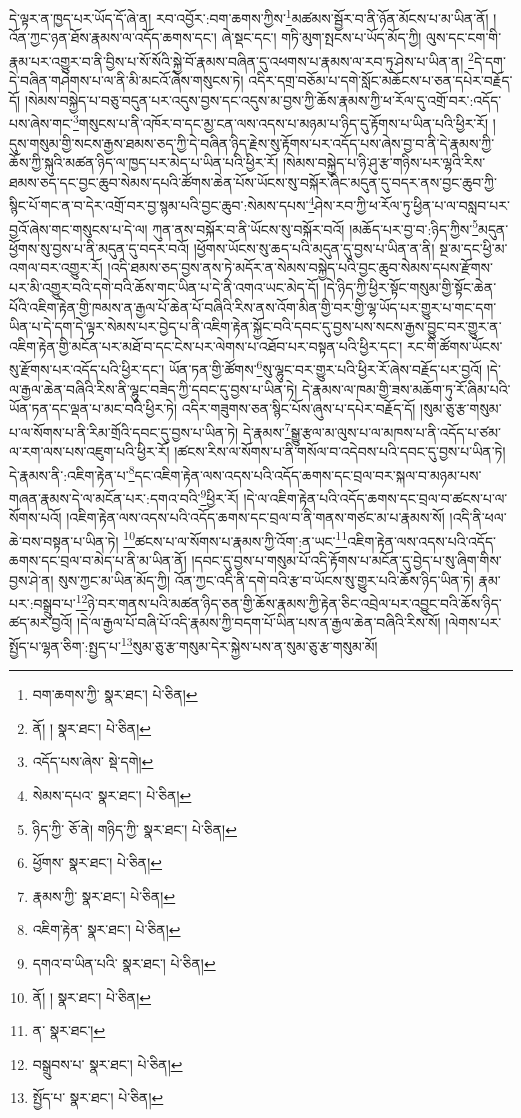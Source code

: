 དེ་ལྟར་ན་ཁྱད་པར་ཡོད་དོ་ཞེ་ན། རབ་འབྱོར་:བག་ཆགས་ཀྱིས་\footnote{བག་ཆགས་ཀྱི་  སྣར་ཐང་།  པེ་ཅིན། }མཚམས་སྦྱོར་བ་ནི་ཉོན་མོངས་པ་མ་ཡིན་ནོ། །འོན་ཀྱང་ཉན་ཐོས་རྣམས་ལ་འདོད་ཆགས་དང་། ཞེ་སྡང་དང་། གཏི་མུག་སྤངས་པ་ཡོད་མོད་ཀྱི། ལུས་དང་ངག་གི་རྣམ་པར་འགྱུར་བ་ནི་བྱིས་པ་སོ་སོའི་སྐྱེ་བོ་རྣམས་བཞིན་དུ་འཕགས་པ་རྣམས་ལ་རབ་ཏུ་ཤེས་པ་ཡིན་ན། \footnote{ནོ། །   སྣར་ཐང་།  པེ་ཅིན། }དེ་དག་དེ་བཞིན་གཤེགས་པ་ལ་ནི་མི་མངའོ་ཞེས་གསུངས་ཏེ། འདིར་དགྲ་བཅོམ་པ་དགེ་སློང་མཆོངས་པ་ཅན་དཔེར་བརྗོད་དོ། །སེམས་བསྐྱེད་པ་བཅུ་བདུན་པར་འདུས་བྱས་དང་འདུས་མ་བྱས་ཀྱི་ཆོས་རྣམས་ཀྱི་ཕ་རོལ་དུ་འགྲོ་བར་:འདོད་པས་ཞེས་གང་\footnote{འདོད་པས་ཞེས་  སྡེ་དགེ། }གསུངས་པ་ནི་འཁོར་བ་དང་མྱ་ངན་ལས་འདས་པ་མཉམ་པ་ཉིད་དུ་རྟོགས་པ་ཡིན་པའི་ཕྱིར་རོ། །དུས་གསུམ་གྱི་སངས་རྒྱས་ཐམས་ཅད་ཀྱི་དེ་བཞིན་ཉིད་རྗེས་སུ་རྟོགས་པར་འདོད་པས་ཞེས་བྱ་བ་ནི་དེ་རྣམས་ཀྱི་ཆོས་ཀྱི་སྐུའི་མཚན་ཉིད་ལ་ཁྱད་པར་མེད་པ་ཡིན་པའི་ཕྱིར་རོ། །སེམས་བསྐྱེད་པ་ཉི་ཤུ་རྩ་གཉིས་པར་ལྷའི་རིས་ཐམས་ཅད་དང་བྱང་ཆུབ་སེམས་དཔའི་ཚོགས་ཆེན་པོས་ཡོངས་སུ་བསྐོར་ཞིང་མདུན་དུ་བདར་ནས་བྱང་ཆུབ་ཀྱི་སྙིང་པོ་གང་ན་བ་དེར་འགྲོ་བར་བྱ་སྙམ་པའི་བྱང་ཆུབ་:སེམས་དཔས་\footnote{སེམས་དཔའ་  སྣར་ཐང་།  པེ་ཅིན། }ཤེས་རབ་ཀྱི་ཕ་རོལ་ཏུ་ཕྱིན་པ་ལ་བསླབ་པར་བྱའོ་ཞེས་གང་གསུངས་པ་དེ་ལ། ཀུན་ནས་བསྐོར་བ་ནི་ཡོངས་སུ་བསྐོར་བའོ། །མཆོད་པར་བྱ་བ་:ཉིད་ཀྱིས་\footnote{ཉིད་ཀྱི་  ཅོ་ནེ། གཉིད་ཀྱི་  སྣར་ཐང་།  པེ་ཅིན། }མདུན་ཕྱོགས་སུ་བྱས་པ་ནི་མདུན་དུ་བདར་བའོ། །ཕྱོགས་ཡོངས་སུ་ཆད་པའི་མདུན་དུ་བྱས་པ་ཡིན་ན་ནི། སྔ་མ་དང་ཕྱི་མ་འགལ་བར་འགྱུར་རོ། །འདི་ཐམས་ཅད་བྱས་ནས་ཏེ་མདོར་ན་སེམས་བསྐྱེད་པའི་བྱང་ཆུབ་སེམས་དཔས་རྫོགས་པར་མི་འགྱུར་བའི་དགེ་བའི་ཆོས་གང་ཡིན་པ་དེ་ནི་འགའ་ཡང་མེད་དོ། །དེ་ཉིད་ཀྱི་ཕྱིར་སྟོང་གསུམ་གྱི་སྟོང་ཆེན་པོའི་འཇིག་རྟེན་གྱི་ཁམས་ན་རྒྱལ་པོ་ཆེན་པོ་བཞིའི་རིས་ནས་འོག་མིན་གྱི་བར་གྱི་ལྷ་ཡོད་པར་གྱུར་པ་གང་དག་ཡིན་པ་དེ་དག་དེ་ལྟར་སེམས་པར་བྱེད་པ་ནི་འཇིག་རྟེན་སྐྱོང་བའི་དབང་དུ་བྱས་པས་སངས་རྒྱས་བྱུང་བར་གྱུར་ན་འཇིག་རྟེན་གྱི་མངོན་པར་མཐོ་བ་དང་ངེས་པར་ལེགས་པ་འཐོབ་པར་བསྟན་པའི་ཕྱིར་དང་། རང་གི་ཚོགས་ཡོངས་སུ་རྫོགས་པར་འདོད་པའི་ཕྱིར་དང་། ཡོན་ཏན་གྱི་ཚོགས་\footnote{ཕྱོགས་  སྣར་ཐང་།  པེ་ཅིན། }སུ་ལྷུང་བར་གྱུར་པའི་ཕྱིར་རོ་ཞེས་བརྗོད་པར་བྱའོ། །དེ་ལ་རྒྱལ་ཆེན་བཞིའི་རིས་ནི་ལྷུང་བཟེད་ཀྱི་དབང་དུ་བྱས་པ་ཡིན་ཏེ། དེ་རྣམས་ལ་ཁམ་གྱི་ཟས་མཆོག་ཏུ་རོ་ཞིམ་པའི་ཡོན་ཏན་དང་ལྡན་པ་མང་བའི་ཕྱིར་ཏེ། འདིར་གཟུགས་ཅན་སྙིང་པོས་ཞུས་པ་དཔེར་བརྗོད་དོ། །སུམ་ཅུ་རྩ་གསུམ་པ་ལ་སོགས་པ་ནི་རིམ་གྲོའི་དབང་དུ་བྱས་པ་ཡིན་ཏེ། དེ་རྣམས་\footnote{རྣམས་ཀྱི་  སྣར་ཐང་།  པེ་ཅིན། }སྒྱུ་རྩལ་མ་ལུས་པ་ལ་མཁས་པ་ནི་འདོད་པ་ཙམ་ལ་རག་ལས་པས་འཇུག་པའི་ཕྱིར་རོ། །ཚངས་རིས་ལ་སོགས་པ་ནི་གསོལ་བ་འདེབས་པའི་དབང་དུ་བྱས་པ་ཡིན་ཏེ། དེ་རྣམས་ནི་:འཇིག་རྟེན་པ་\footnote{འཇིག་རྟེན་  སྣར་ཐང་།  པེ་ཅིན། }དང་འཇིག་རྟེན་ལས་འདས་པའི་འདོད་ཆགས་དང་བྲལ་བར་སྐལ་བ་མཉམ་པས་གཞན་རྣམས་དེ་ལ་མངོན་པར་:དགའ་བའི་\footnote{དགའ་བ་ཡིན་པའི་  སྣར་ཐང་།  པེ་ཅིན། }ཕྱིར་རོ། །དེ་ལ་འཇིག་རྟེན་པའི་འདོད་ཆགས་དང་བྲལ་བ་ཚངས་པ་ལ་སོགས་པའོ། །འཇིག་རྟེན་ལས་འདས་པའི་འདོད་ཆགས་དང་བྲལ་བ་ནི་གནས་གཙང་མ་པ་རྣམས་སོ། །འདི་ནི་ཕལ་ཆེ་བས་བསྟན་པ་ཡིན་ཏེ། \footnote{ནོ། །   སྣར་ཐང་།  པེ་ཅིན། }ཚངས་པ་ལ་སོགས་པ་རྣམས་ཀྱི་འོག་:ན་ཡང་\footnote{ན་  སྣར་ཐང་། }འཇིག་རྟེན་ལས་འདས་པའི་འདོད་ཆགས་དང་བྲལ་བ་མེད་པ་ནི་མ་ཡིན་ནོ། །དབང་དུ་བྱས་པ་གསུམ་པོ་འདི་རྟོགས་པ་མངོན་དུ་བྱེད་པ་སུ་ཞིག་གིས་བྱས་ཤེ་ན། སུས་ཀྱང་མ་ཡིན་མོད་ཀྱི། འོན་ཀྱང་འདི་ནི་དགེ་བའི་རྩ་བ་ཡོངས་སུ་གྱུར་པའི་ཆོས་ཉིད་ཡིན་ཏེ། རྣམ་པར་:བསྒྲུབ་པ་\footnote{བསྒྲུབས་པ་  སྣར་ཐང་།  པེ་ཅིན། }ཉེ་བར་གནས་པའི་མཚན་ཉིད་ཅན་གྱི་ཆོས་རྣམས་ཀྱི་རྟེན་ཅིང་འབྲེལ་པར་འབྱུང་བའི་ཆོས་ཉིད་ཚད་མར་བྱའོ། །དེ་ལ་རྒྱལ་པོ་བཞི་པོ་འདི་རྣམས་ཀྱི་བདག་པོ་ཡིན་པས་ན་རྒྱལ་ཆེན་བཞིའི་རིས་སོ། །ལེགས་པར་སྤྱོད་པ་ལྷན་ཅིག་:སྤྱད་པ་\footnote{སྤྱོད་པ་  སྣར་ཐང་།  པེ་ཅིན། }སུམ་ཅུ་རྩ་གསུམ་དེར་སྐྱེས་པས་ན་སུམ་ཅུ་རྩ་གསུམ་མོ། 